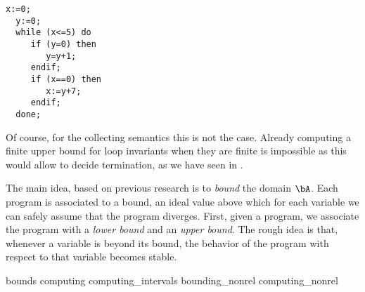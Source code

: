 \begin{lstlisting}[caption=Code sample where analysis of
  \(\fix{\com}\) is less precise than \(\com^*\), label=code1,
  language=Imp]
  x:=0;
  y:=0;
  while (x<=5) do
     if (y=0) then
        y=y+1;
     endif;
     if (x==0) then
        x:=y+7;
     endif;
  done;
\end{lstlisting}

Of course, for the collecting semantics this is not the case. Already
computing a finite upper bound for loop invariants when they are
finite is impossible as this would allow to decide termination, as we
have seen in .


The main idea, based on previous research is to \emph{bound} the
domain \(\bA\). Each program is associated to a bound, an ideal value
above which for each variable we can safely assume that the program
diverges.  First, given a program, we associate the program with a
\emph{lower bound} and an \emph{upper bound}. The rough idea is that,
whenever a variable is beyond its bound, the behavior of the program
with respect to that variable becomes stable. %

{bounds}
{computing}
{computing_intervals}
{bounding_nonrel}
{computing_nonrel}
